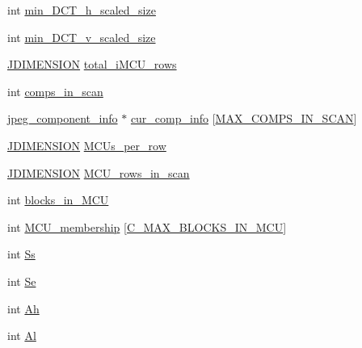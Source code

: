 \begin{DoxyCompactItemize}
\item 
int \hyperlink{structjpeg__compress__struct_a99a75ca2f7569dcb4444e7cb35ce916f}{min\+\_\+\+D\+C\+T\+\_\+h\+\_\+scaled\+\_\+size}
\item 
int \hyperlink{structjpeg__compress__struct_a5d63d182b17f0885fcabf88c6a08a9a5}{min\+\_\+\+D\+C\+T\+\_\+v\+\_\+scaled\+\_\+size}
\item 
\hyperlink{jmorecfg_8h_a04ed4674f6f1d0d50ec241531e38274f}{J\+D\+I\+M\+E\+N\+S\+I\+O\+N} \hyperlink{structjpeg__compress__struct_aef01162f4c66434929f933a40e695f9e}{total\+\_\+i\+M\+C\+U\+\_\+rows}
\item 
int \hyperlink{structjpeg__compress__struct_a3387358088abbec1c8838499966c8f06}{comps\+\_\+in\+\_\+scan}
\item 
\hyperlink{structjpeg__component__info}{jpeg\+\_\+component\+\_\+info} $\ast$ \hyperlink{structjpeg__compress__struct_a1cacb367b7d69227d3086ff105bca9ab}{cur\+\_\+comp\+\_\+info} \mbox{[}\hyperlink{jpeglib_8h_adc7013da016c19051dc623fb3d8b35b4}{M\+A\+X\+\_\+\+C\+O\+M\+P\+S\+\_\+\+I\+N\+\_\+\+S\+C\+A\+N}\mbox{]}
\item 
\hyperlink{jmorecfg_8h_a04ed4674f6f1d0d50ec241531e38274f}{J\+D\+I\+M\+E\+N\+S\+I\+O\+N} \hyperlink{structjpeg__compress__struct_a97f0c5e0ae932d1810007077443da684}{M\+C\+Us\+\_\+per\+\_\+row}
\item 
\hyperlink{jmorecfg_8h_a04ed4674f6f1d0d50ec241531e38274f}{J\+D\+I\+M\+E\+N\+S\+I\+O\+N} \hyperlink{structjpeg__compress__struct_ab605396740a26114095bf99c7c7349fb}{M\+C\+U\+\_\+rows\+\_\+in\+\_\+scan}
\item 
int \hyperlink{structjpeg__compress__struct_ac32cf016a916984f68f158e5310a16bb}{blocks\+\_\+in\+\_\+\+M\+C\+U}
\item 
int \hyperlink{structjpeg__compress__struct_a6debf977451892aae1116b47c5c1c95f}{M\+C\+U\+\_\+membership} \mbox{[}\hyperlink{jpeglib_8h_a4f270f4efb3fc0bb09f0d5ffa51ca327}{C\+\_\+\+M\+A\+X\+\_\+\+B\+L\+O\+C\+K\+S\+\_\+\+I\+N\+\_\+\+M\+C\+U}\mbox{]}
\item 
int \hyperlink{structjpeg__compress__struct_adda4b7ef0dda94b38b6e34df42769d81}{Ss}
\item 
int \hyperlink{structjpeg__compress__struct_af2c1fe7c62791cda75219c10d71132d9}{Se}
\item 
int \hyperlink{structjpeg__compress__struct_a301a95efc904d22aca78592f7a21673a}{Ah}
\item 
int \hyperlink{structjpeg__compress__struct_a4160152697f6042b8fe1d6838a8118e2}{Al}
\item 

\end{DoxyCompactItemize}
